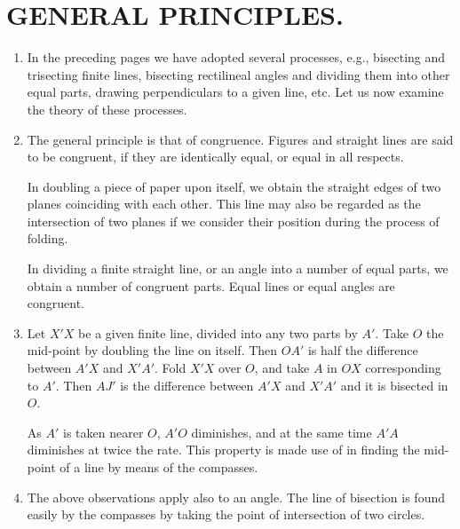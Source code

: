 
\chapter{GENERAL PRINCIPLES.}

\begin{enumerate}

\item In the preceding pages we have adopted several processes, e.g., bisecting
      and trisecting finite lines, bisecting rectilineal angles and dividing 
      them into other equal parts, drawing perpendiculars to a given line, etc. 
      Let us now examine the theory of these processes.

\item The general principle is that of congruence.  Figures and straight lines
      are said to be congruent, if they are identically equal, or equal in all 
      respects.

      In doubling a piece of paper upon itself, we obtain the straight edges of
      two planes coinciding with each other.  This line may also be regarded as
      the intersection of two planes if we consider their position during the
      process of folding.

      In dividing a finite straight line, or an angle into a number of equal parts,
      we obtain a number of congruent parts.  Equal lines or equal angles are
      congruent.


\item Let $X'X$ be a given finite line, divided into any two parts by $A'$. Take
      $O$ the mid-point by doubling the line on itself. Then $OA'$ is half the
      difference between $A'X$ and $X'A'$. Fold $X'X$ over $O$, and take $A$ in
      $OX$ corresponding to $A'$.  Then $AJ'$ is the difference between $A'X$ 
      and $X'A'$ and it is bisected in $O$.  


      As $A'$ is taken nearer $O$, $A'O$ diminishes, and at the same time $A'A$
      diminishes at twice the rate. This property is made use of in finding the 
      mid-point of a line by means of the compasses.

\item The above observations apply also to an angle. The line of bisection is
      found easily by the compasses by taking the point of intersection of two 
      circles.



\end{enumerate}

